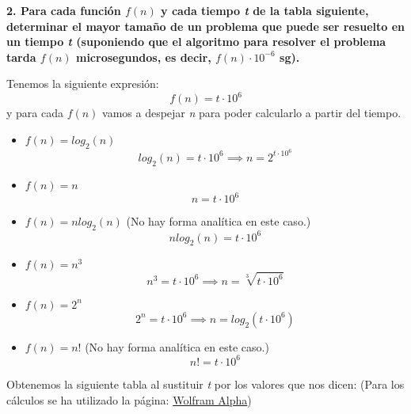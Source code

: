 \documentclass{article}
\begin{document}
\newpage
\begin{flushleft}
{\large\textbf{2. Para cada función $f(n)$ y cada tiempo \textit{t} de la tabla siguiente, determinar
el mayor tamaño de un problema que puede ser resuelto en un tiempo \textit{t} (suponiendo que el
algoritmo para resolver el problema tarda $f(n)$ microsegundos, es decir, $f(n) \cdot 10^{-6}$ sg).}}

\vspace{\baselineskip}

Tenemos la siguiente expresión:
	$$f(n) = t \cdot 10^{6}$$
y para cada $f(n)$ vamos a despejar \textit{n} para poder calcularlo a partir del tiempo.
\end{flushleft}

\begin{itemize}

	\item $f(n) = log_{2}(n)$
		$$log_{2}(n) = t \cdot 10^{6} \implies n = 2^{t \cdot 10^{6}}$$

	\item $f(n) = n$
		$$n = t \cdot 10^{6}$$

	\item $f(n) = nlog_{2}(n)$ (No hay forma analítica en este caso.)
		$$nlog_{2}(n) = t \cdot 10^{6}$$

	\item $f(n) = n^{3}$
		$$n^{3} = t \cdot 10^{6} \implies n = \sqrt[3]{t \cdot 10^{6}}$$

	\item $f(n) = 2^{n}$
		$$2^{n} = t \cdot 10^{6} \implies n = log_{2}(t \cdot 10^{6})$$

	\item $f(n) = n!$ (No hay forma analítica en este caso.)
		$$n! = t \cdot 10^{6}$$

\end{itemize}
\vspace{\baselineskip}

\begin{flushleft}
Obtenemos la siguiente tabla al sustituir \textit{t} por los valores que nos dicen:
\newline
(Para los cálculos se ha utilizado la página: \href{https://www.wolframalpha.com}{Wolfram Alpha})
\end{flushleft}
\end{document}
